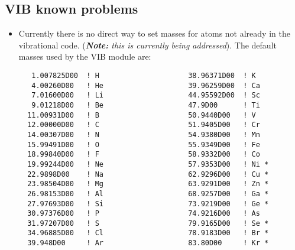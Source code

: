 \subsection{VIB known problems}
\begin{itemize}
\item Currently there is no direct way to set masses for atoms not
  already in the vibrational code.  ({\it {\bf Note:} this is
    currently being addressed}).  The default masses used by the VIB
  module are:
\begin{verbatim}
   1.007825D00  ! H                     38.96371D00  ! K   
   4.00260D00   ! He                    39.96259D00  ! Ca  
   7.01600D00   ! Li                    44.95592D00  ! Sc  
   9.01218D00   ! Be                    47.9D00      ! Ti  
  11.00931D00   ! B                     50.9440D00   ! V   
  12.00000D00   ! C                     51.9405D00   ! Cr  
  14.00307D00   ! N                     54.9380D00   ! Mn  
  15.99491D00   ! O                     55.9349D00   ! Fe  
  18.99840D00   ! F                     58.9332D00   ! Co  
  19.99244D00   ! Ne                    57.9353D00   ! Ni *
  22.9898D00    ! Na                    62.9296D00   ! Cu *
  23.98504D00   ! Mg                    63.9291D00   ! Zn *
  26.98153D00   ! Al                    68.9257D00   ! Ga *
  27.97693D00   ! Si                    73.9219D00   ! Ge *
  30.97376D00   ! P                     74.9216D00   ! As  
  31.97207D00   ! S                     79.9165D00   ! Se *
  34.96885D00   ! Cl                    78.9183D00   ! Br *
  39.948D00     ! Ar                    83.80D00     ! Kr *
\end{verbatim}
\end{itemize}
